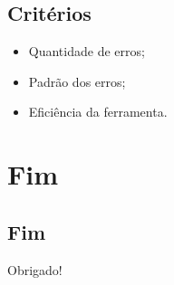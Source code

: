 \documentclass{beamer}
\begin{document}
\subsection{Critérios}
\begin{frame}
  \begin{itemize}
      \item Quantidade de erros;  
      \item Padrão dos erros;
      \item Eficiência da ferramenta.
  \end{itemize}
\end{frame}






\section{Fim}
\subsection{Fim}
\begin{frame}
\Huge{\centerline{Obrigado!}}
\end{frame}

\end{document}
